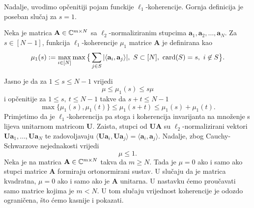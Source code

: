 \documentclass[a4paper,twoside,12pt]{memoir} %
\newcommand{\vect}[1]{\mathbf{#1}}
\renewcommand{\vec}{\vect}
\newcommand{\card}{\text{\normalfont{card}}}
\begin{document}
Nadalje, uvodimo op\v{c}enitiji pojam funckije $\ell_1$-koherencije. Gornja definicija je poseban slu\v{c}aj za $s = 1$.
\begin{defn}
    Neka je matrica $\vec A \in \C^{m \times N}$ sa $\ell_2$-normaliziranim stupcima  $\vec a_1, \vec a_2, \dots, \vec a_N$. Za $s \in [N-1]$, funkcija $\ell_1$-koherencije $\mu_1$ matrice $\vec A$ je definirana kao
    \begin{equation*}
        \mu_1(s) := \max_{i \in [N]} \max \big\{ \sum_{j \in S} |\langle \vec a_i, \vec a_j \rangle|,\ S \subset [N],\ \card(S) = s,\ i \not \in S   \big\} .
    \end{equation*}
\end{defn}
Jasno je da za $1 \leq s \leq N-1$ vrijedi
\begin{equation}\label{5:2}
    \mu \leq \mu_1(s) \leq s \mu
\end{equation}
i op\v{c}enitije za $1 \leq s,\ t \leq N-1$ takve da $s+t \leq N-1$
\begin{equation}\label{5:3}
    \max \{\mu_1(s), \mu_1(t)\}  \leq \mu_1(s+t) \leq \mu_1(s) + \mu_1(t).
\end{equation}
Primjetimo da je $\ell_1$-koherencija pa stoga i koherencija invarijanta na mno\v{z}enje s lijeva unitarnom matricom $\vec U$. Zaista, stupci od $\vec{UA}$ su $\ell_2$-normalizirani vektori $\vec{Ua}_1, \dots, \vec{Ua}_N$ te zadovoljavaju $\langle \vec{Ua}_i, \vec{Ua}_j \rangle = \langle \vec a_i , \vec a_j \rangle$. Nadalje, zbog Cauchy-Schwarzove nejednakosti vrijedi
\begin{equation*}
   \mu \leq 1. 
\end{equation*}
Neka je na matrica $\vec A \in \C^{m \times N}$ takva da $m \geq N$. Tada je $\mu = 0$ ako i samo ako stupci matrice $\vec A$ formiraju ortonormirani sustav. U slu\v{c}aju da je matrica kvadratna, $\mu = 0$ ako i samo ako je $\vec A$ unitarna. U nastavku \'cemo prou\v{c}avati samo matrice kojima je $m < N$. U tom slu\v{c}aju vrijednost koherencije je odozdo ograni\v{c}ena, \v{s}to \'cemo kasnije i pokazati. 
\end{document}
